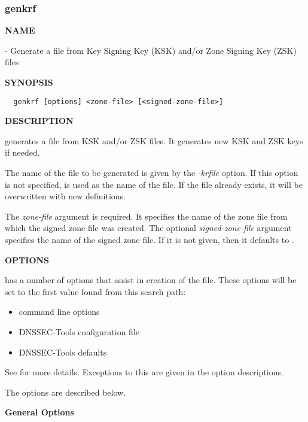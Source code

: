 \clearpage

\subsubsection{genkrf}

{\bf NAME}

 - Generate a  file from Key Signing Key (KSK)
and/or Zone Signing Key (ZSK) files

{\bf SYNOPSIS}

\begin{verbatim}
  genkrf [options] <zone-file> [<signed-zone-file>]
\end{verbatim}

{\bf DESCRIPTION}

 generates a  file from KSK and/or ZSK files.  It
generates new KSK and ZSK keys if needed.

The name of the  file to be generated is given by the {\it
-krfile} option.  If this option is not specified,  is used
as the name of the  file.  If the  file already
exists, it will be overwritten with new  definitions.

The {\it zone-file} argument is required.  It specifies the name of the
zone file from which the signed zone file was created.  The optional
{\it signed-zone-file} argument specifies the name of the signed zone file.
If it is not given, then it defaults to .

{\bf OPTIONS}

 has a number of options that assist in creation of the
 file.  These options will be set to the first value
found from this search path:

\begin{itemize}
\item command line options
\item DNSSEC-Tools configuration file
\item DNSSEC-Tools defaults
\end{itemize}

See  for more details.
Exceptions to this are given in the option descriptions.

The  options are described below.

{\bf General  Options}

